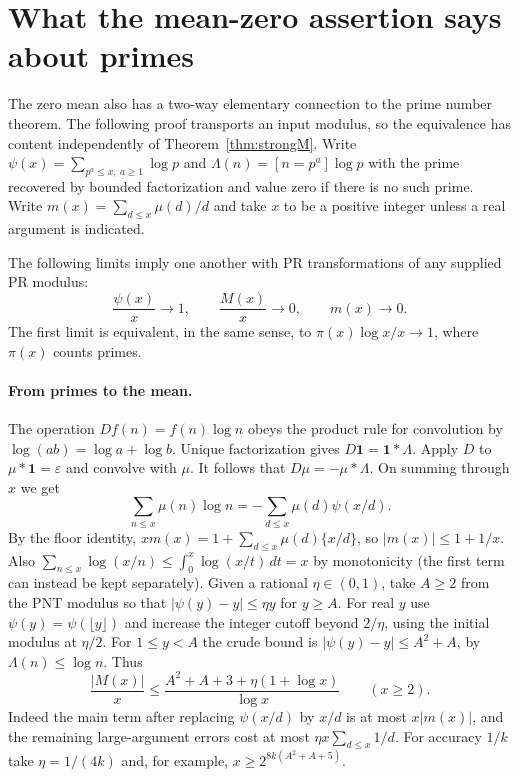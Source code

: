 \section{What the mean-zero assertion says about primes}\label{sec:pnt}
The zero mean also has a two-way elementary connection to the prime
number theorem. The following proof transports an input modulus, so
the equivalence has content independently of Theorem~\ref{thm:strongM}.
Write $\psi(x)=\sum_{p^a\le x,\ a\ge1}\log p$ and
$\Lambda(n)=[n=p^a]\log p$ with the prime recovered by bounded
factorization and value zero if there is no such prime.
Write $m(x)=\sum_{d\le x}\mu(d)/d$ and take $x$ to be a positive
integer unless a real argument is indicated.

\begin{theorem}
The following limits imply one another with PR transformations of any
supplied PR modulus:
\[
  \frac{\psi(x)}x\longrightarrow1,\qquad
  \frac{M(x)}x\longrightarrow0,\qquad m(x)\longrightarrow0.
\]
The first limit is equivalent, in the same sense, to
$\pi(x)\log x/x\longrightarrow1$, where $\pi(x)$ counts primes.
\end{theorem}

\paragraph{From primes to the mean.}
The operation $Df(n)=f(n)\log n$ obeys the product rule for
convolution by $\log(ab)=\log a+\log b$.
Unique factorization gives $D\mathbf1=\mathbf1*\Lambda$.
Apply $D$ to $\mu*\mathbf1=\varepsilon$ and convolve with $\mu$.
It follows that $D\mu=-\mu*\Lambda$. On summing through $x$ we get
\[
 \sum_{n\le x}\mu(n)\log n=-\sum_{d\le x}\mu(d)\psi(x/d).
\]
By the floor identity, $xm(x)=1+\sum_{d\le x}\mu(d)\{x/d\}$,
so $|m(x)|\le1+1/x$. Also
$\sum_{n\le x}\log(x/n)\le\int_0^x\log(x/t)\,dt=x$
by monotonicity (the first term can instead be kept separately).
Given a rational $\eta\in(0,1)$, take $A\ge2$ from the PNT modulus
so that $|\psi(y)-y|\le\eta y$ for $y\ge A$. For real $y$ use
$\psi(y)=\psi(\lfloor y\rfloor)$ and increase the integer cutoff
beyond $2/\eta$, using the initial modulus at $\eta/2$.
For $1\le y<A$ the crude bound is $|\psi(y)-y|\le A^2+A$, by
$\Lambda(n)\le\log n$. Thus
\[
 \frac{|M(x)|}{x}\le
 \frac{A^2+A+3+\eta(1+\log x)}{\log x}\qquad(x\ge2).
\]
Indeed the main term after replacing $\psi(x/d)$ by $x/d$ is at most
$x|m(x)|$, and the remaining large-argument errors cost at most
$\eta x\sum_{d\le x}1/d$. For accuracy $1/k$ take
$\eta=1/(4k)$ and, for example, $x\ge2^{8k(A^2+A+5)}$.

